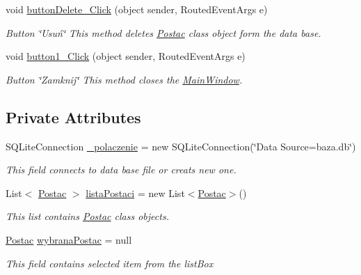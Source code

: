 \begin{DoxyCompactItemize}
void \hyperlink{class_projekt_p_o_s_1_1_main_window_ac955d8aa2cc3dceeafa88d532c69a5e3}{button\+Delete\+\_\+\+Click} (object sender, Routed\+Event\+Args e)
\begin{DoxyCompactList}\small\item\em Button \char`\"{}\+Usuń\char`\"{} This method deletes \hyperlink{class_projekt_p_o_s_1_1_postac}{Postac} class object form the data base. \end{DoxyCompactList}\item 
void \hyperlink{class_projekt_p_o_s_1_1_main_window_a86639632a4f0c369581fba5be73a211f}{button1\+\_\+\+Click} (object sender, Routed\+Event\+Args e)
\begin{DoxyCompactList}\small\item\em Button \char`\"{}\+Zamknij\char`\"{} This method closes the \hyperlink{class_projekt_p_o_s_1_1_main_window}{Main\+Window}. \end{DoxyCompactList}\end{DoxyCompactItemize}
\subsection*{Private Attributes}
\begin{DoxyCompactItemize}
\item 
S\+Q\+Lite\+Connection \hyperlink{class_projekt_p_o_s_1_1_main_window_a9b68fbebcc348b5a1d0a0370d1180ba6}{\+\_\+polaczenie} = new S\+Q\+Lite\+Connection(\char`\"{}Data Source=baza.\+db\char`\"{})
\begin{DoxyCompactList}\small\item\em This field connects to data base file or creats new one. \end{DoxyCompactList}\item 
List$<$ \hyperlink{class_projekt_p_o_s_1_1_postac}{Postac} $>$ \hyperlink{class_projekt_p_o_s_1_1_main_window_abe462d9c2e721c3476d858fb870fa4b4}{lista\+Postaci} = new List$<$\hyperlink{class_projekt_p_o_s_1_1_postac}{Postac}$>$()
\begin{DoxyCompactList}\small\item\em This list contains \hyperlink{class_projekt_p_o_s_1_1_postac}{Postac} class objects. \end{DoxyCompactList}\item 
\hyperlink{class_projekt_p_o_s_1_1_postac}{Postac} \hyperlink{class_projekt_p_o_s_1_1_main_window_ad0cd50357b42ca42fed4b16ba859c645}{wybrana\+Postac} = null
\begin{DoxyCompactList}\small\item\em This field contains selected item from the list\+Box \end{DoxyCompactList}\end{DoxyCompactItemize}


